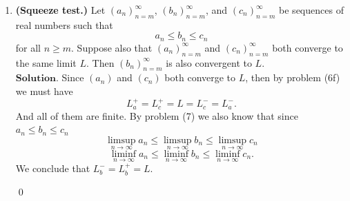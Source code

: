 \documentclass{article}
\theoremstyle{remark}
\begin{document}
\begin{enumerate}
\begin{enumerate}
            \item The case for infimum is analogous to the one before.
            
            \item Suppose for the sake of contradiction that 
            \[
            \limsup_{n\to\infty} a_n > \limsup_{n\to\infty} b_n
            \]
            hence, $L_{a}^+ > L_{b}^+$, then
            for any $N \geq m$ it holds that
            \[
            a_n > L_{b}^+
            \]
            for some $n \geq N$.
            This implies that fixing $n_0 \geq N$ there must also exist some $N' \geq m$ such that for any $n \geq N'$
            \[
            b_n < a_{n_0}.
            \]
            Then, we let $N = N'$ so that we can fix any $a_{n} \geq N'$ so in particular we must have 
            \[
            b_{n_0} < a_{n_0}.
            \]
            A contradiction, since $a_{n} \leq b_{n}$ for any $n \geq m$.
            
            \item The case for the infimum is analogous to the one before.
        \end{enumerate}
        \begin{flushright}
            \qed
        \end{flushright}

        \item \textbf{(Squeeze test.)}
        Let $(a_n)_{n=m}^{\infty}$, $(b_n)_{n=m}^{\infty}$, and $(c_n)_{n=m}^{\infty}$ be sequences of real numbers such that
        \[
        a_n \leq b_n \leq c_n
        \]
        for all $n \geq m$. Suppose also that $(a_n)_{n=m}^{\infty}$ and $(c_n)_{n=m}^{\infty}$ both converge to the same limit $L$. Then $(b_n)_{n=m}^{\infty}$ is also convergent to $L$.
        \\$\textbf{Solution.}$
        Since $(a_n)$ and $(c_n)$ both converge to $L$, then by problem (6f) we must have 
        \[
        L_{a}^+ = L_{c}^+ = L = L_{c}^- = L_{a}^{-}.
        \]
        And all of them are finite.
        By problem (7) we also know that since $a_n \leq b_n \leq c_n$
        \[
        \limsup_{n\to\infty}a_n \leq \limsup_{n\to\infty} b_n \leq \limsup_{n\to\infty} c_n
        \]
        \[
        \liminf_{n\to\infty}a_n \leq \liminf_{n\to\infty} b_n \leq \liminf_{n\to\infty} c_n.
        \]
        We conclude that $L_{b}^- = L_{b}^{+} = L$.
        \begin{flushright}
            \qed
        \end{flushright}


\end{enumerate}
\end{document}

